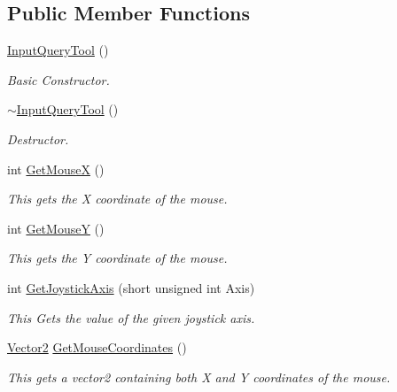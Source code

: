 \subsection*{Public Member Functions}
\begin{DoxyCompactItemize}
\item 
\hyperlink{classphys_1_1InputQueryTool_a10a997ec2e072d31808c794542c0516f}{InputQueryTool} ()
\begin{DoxyCompactList}\small\item\em Basic Constructor. \item\end{DoxyCompactList}\item 
\hyperlink{classphys_1_1InputQueryTool_a6a37616800928b691932045ba34759b8}{$\sim$InputQueryTool} ()
\begin{DoxyCompactList}\small\item\em Destructor. \item\end{DoxyCompactList}\item 
int \hyperlink{classphys_1_1InputQueryTool_a1df560487b85fcb90fd9294f3009eee6}{GetMouseX} ()
\begin{DoxyCompactList}\small\item\em This gets the X coordinate of the mouse. \item\end{DoxyCompactList}\item 
int \hyperlink{classphys_1_1InputQueryTool_a5cab535728ba864a83e7c374cc683d0b}{GetMouseY} ()
\begin{DoxyCompactList}\small\item\em This gets the Y coordinate of the mouse. \item\end{DoxyCompactList}\item 
int \hyperlink{classphys_1_1InputQueryTool_ae8b922315b271a2eeb376f10a7c97cf4}{GetJoystickAxis} (short unsigned int Axis)
\begin{DoxyCompactList}\small\item\em This Gets the value of the given joystick axis. \item\end{DoxyCompactList}\item 
\hyperlink{classphys_1_1Vector2}{Vector2} \hyperlink{classphys_1_1InputQueryTool_affd9523f67b542b208e6d36c3395e72b}{GetMouseCoordinates} ()
\begin{DoxyCompactList}\small\item\em This gets a vector2 containing both X and Y coordinates of the mouse. \item\end{DoxyCompactList}\item 

\end{DoxyCompactItemize}
